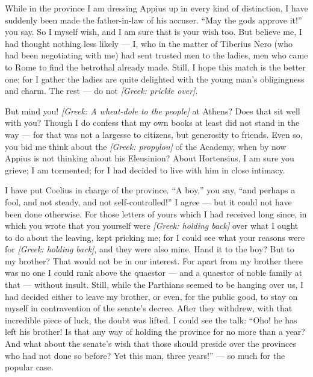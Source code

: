 

 While in the province I am dressing Appius up in every kind of distinction, I have suddenly been made the father-in-law of his accuser. ``May the gods approve it!'' you say. So I myself wish, and I am sure that is your wish too. But believe me, I had thought nothing less likely --- I, who in the matter of Tiberius Nero (who had been negotiating with me) had sent trusted men to the ladies, men who came to Rome to find the betrothal already made. Still, I hope this match is the better one; for I gather the ladies are quite delighted with the young man's obligingness and charm. The rest --- do not \textit{[Greek: prickle over]}.

 But mind you! \textit{[Greek: A wheat-dole to the people]} at Athens? Does that sit well with you? Though I do confess that my own books at least did not stand in the way --- for that was not a largesse to citizens, but generosity to friends. Even so, you bid me think about the \textit{[Greek: propylon]} of the Academy, when by now Appius is not thinking about his Eleusinion? About Hortensius, I am sure you grieve; I am tormented; for I had decided to live with him in close intimacy.

 I have put Coelius in charge of the province. ``A boy,'' you say, ``and perhaps a fool, and not steady, and not self-controlled!'' I agree --- but it could not have been done otherwise. For those letters of yours which I had received long since, in which you wrote that you yourself were \textit{[Greek: holding back]} over what I ought to do about the leaving, kept pricking me; for I could see what your reasons were for \textit{[Greek: holding back]}, and they were also mine. Hand it to the boy? But to my brother? That would not be in our interest. For apart from my brother there was no one I could rank above the quaestor --- and a quaestor of noble family at that --- without insult. Still, while the Parthians seemed to be hanging over us, I had decided either to leave my brother, or even, for the public good, to stay on myself in contravention of the senate's decree. After they withdrew, with that incredible piece of luck, the doubt was lifted. I could see the talk: ``Oho! he has left his brother! Is that any way of holding the province for no more than a year? And what about the senate's wish that those should preside over the provinces who had not done so before? Yet this man, three years!'' --- so much for the popular case.

